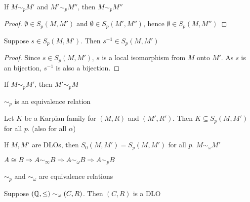 \documentclass[11pt]{article}
\begin{document}
\begin{corollary}[]
If \(M\sim_pM'\) and \(M'\sim_pM''\), then \(M\sim_pM''\)
\end{corollary}

\begin{proof}
\(\emptyset\in S_p(M,M')\) and \(\emptyset\in S_p(M',M'')\), hence \(\emptyset\in S_p(M,M'')\)
\end{proof}

\begin{theorem}[]
Suppose \(s\in S_p(M,M')\). Then \(s^{-1}\in S_p(M,M')\)
\end{theorem}

\begin{proof}
Since \(s\in S_p(M,M')\), \(s\) is a local isomorphism from \(M\) onto \(M'\). As \(s\) is an
bijection, \(s^{-1}\) is also a bijection.
\end{proof}

\begin{corollary}[]
If \(M\sim_pM'\), then \(M'\sim_pM\)
\end{corollary}

\(\sim_p\) is an equivalence relation

\begin{theorem}[]
Let \(K\) be a Karpian family for \((M,R)\) and \((M',R')\). Then \(K\subseteq S_p(M,M')\) for
all \(p\). (also for all \(\alpha\))
\end{theorem}

\begin{corollary}[]
If \(M,M'\) are DLOs, then \(S_0(M,M')=S_p(M,M')\) for all \(p\). \(M\sim_\omega M'\)
\end{corollary}

\begin{corollary}[]
\(A\cong B \Longrightarrow A\sim_\infty B\Longrightarrow A\sim_\omega B\Rightarrow A\sim_pB\)
\end{corollary}

\begin{corollary}[]
\(\sim_p\) and \(\sim_\omega\) are equivalence relations
\end{corollary}

\begin{theorem}[]
Suppose \((\mathbb{Q},\le)\sim_\omega(C,R)\). Then \((C,R)\) is a DLO
\end{theorem}
\end{document}
